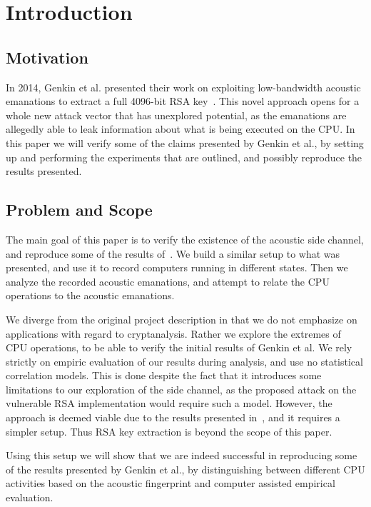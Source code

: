 \chapter{Introduction}\label{chp:introduction} 

\section{Motivation}
In 2014, Genkin et al. presented their work on exploiting low-bandwidth acoustic emanations to extract a full 4096-bit RSA key~\cite{DBLP:conf/crypto/GenkinST14}.
This novel approach opens for a whole new attack vector that has unexplored potential, as the emanations are allegedly able to leak information about what is being executed on the CPU.
In this paper we will verify some of the claims presented by Genkin et al., by setting up and performing the experiments that are outlined, and possibly reproduce the results presented.


\section{Problem and Scope}
The main goal of this paper is to verify the existence of the acoustic side channel, and reproduce some of the results of~\cite{DBLP:conf/crypto/GenkinST14}.
We build a similar setup to what was presented, and use it to record computers running in different states.
Then we analyze the recorded acoustic emanations, and attempt to relate the CPU operations to the acoustic emanations.

We diverge from the original project description in that we do not emphasize on applications with regard to cryptanalysis.
Rather we explore the extremes of CPU operations, to be able to verify the initial results of Genkin et al.
We rely strictly on empiric evaluation of our results during analysis, and use no statistical correlation models.
This is done despite the fact that it introduces some limitations to our exploration of the side channel, as the proposed attack on the vulnerable RSA implementation would require such a model.
However, the approach is deemed viable due to the results presented in~\cite{DBLP:conf/crypto/GenkinST14}, and it requires a simpler setup.
Thus RSA key extraction is beyond the scope of this paper.

Using this setup we will show that we are indeed successful in reproducing some of the results presented by Genkin et al., by distinguishing between different CPU activities based on the acoustic fingerprint and computer assisted empirical evaluation.

